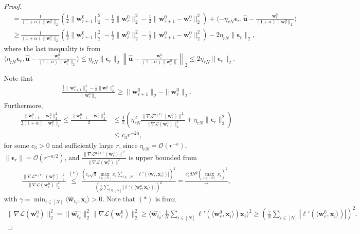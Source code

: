 \documentclass{article} %
\theoremstyle{plain}
\theoremstyle{definition}
\theoremstyle{remark}
\def\bignorm#1{\left\lVert#1\right\rVert}
\def\bigopen#1{\left(#1\right)}
\newcommand{\Ls}{\mathcal{L}}
\def\ba{{\boldsymbol a}}
\def\bu{{\mathbf u}}
\def\bx{{\mathbf x}}
\def\bw{{\mathbf w}}
\begin{document}
\begin{proof}
\begin{align*}
        &=\frac{1}{(1+\alpha)\|\bw_r^0\|_2}\bigopen{\frac{1}{2}\|\bw_{r+1}^0\|_2^2 - \frac{1}{2}\|\bw_r^0\|_2^2 - \frac{1}{2}\|\bw_{r+1}^0-\bw_{r}^0\|_2^2} + \langle -\eta_{rN}\boldsymbol{\epsilon}_r, \hat{\bu} - \frac{\bw_r^0}{(1+\alpha)\|\bw_r^0\|_2} \rangle \\
        & \geq \frac{1}{(1+\alpha)\|\bw_r^0\|_2}\bigopen{\frac{1}{2}\|\bw_{r+1}^0\|_2^2 - \frac{1}{2}\|\bw_r^0\|_2^2 - \frac{1}{2}\|\bw_{r+1}^0-\bw_{r}^0\|_2^2} -2\eta_{rN} \|\boldsymbol{\epsilon}_r\|_2,
    \end{align*}
    where the last inequality is from $\langle\eta_{rN}\boldsymbol{\epsilon}_r, \hat{\bu} - \frac{\bw_r^0}{(1+\alpha)\|\bw_r^0\|_2} \rangle \leq \eta_{rN} \|\boldsymbol{\epsilon}_r\|_2\bignorm{\hat{\bu} - \frac{\bw_r^0}{(1+\alpha)\|\bw_r^0\|}}_2 \leq 2 \eta_{rN} \|\boldsymbol{\epsilon}_r\|_2$.
    
    Note that 
    \begin{align*}
        \frac{\frac{1}{2}\|\bw_{r+1}^0\|_2^2 - \frac{1}{2}\|\bw_r^0\|_2^2}{\|\bw_r^0\|_2} \geq \|\bw_{r+1}^0\|_2 - \|\bw_r^0\|_2.
    \end{align*}
    Furthermore, 
    \begin{align*}
        \frac{\|\bw_{r+1}^0-\bw_{r}^0\|_2^2}{2(1+\alpha)\|\bw_r^0\|_2} \leq \frac{\|\bw_{r+1}^0-\bw_{r}^0\|_2^2}{2} &\leq \frac{1}{2}\bigopen{\eta_{rN}^2 \frac{\|\nabla \Ls^{\ba(r)}(\bw_r^0)\|^2}{\|\nabla \Ls(\bw_r^0)\|_2^2} + \eta_{rN} \|\boldsymbol{\epsilon}_r\|_2^2}\\
        & \leq c_3 r^{-2a},
    \end{align*}
    for some $c_3>0$ and sufficiently large $r$, since $\eta_{rN} = \mathcal{O}(r^{-a})$, $\|\boldsymbol{\epsilon}_r\|=\mathcal{O}(r^{-a/2})$, and $\frac{\|\nabla \Ls^{\ba(r)}(\bw_r^0)\|^2}{\|\nabla \Ls(\bw_r^0)\|^2}$ is upper bounded from
    \begin{align*}
        \frac{\|\nabla \Ls^{\ba(r)}(\bw_r^0)\|_2^2}{\|\nabla \Ls(\bw_r^0)\|_2^2} \overset{(*)}{\leq} \frac{\bigopen{c_2\sqrt{d}\max_{i \in [N]}x_i\sum_{i \in [N]}|\ell'(\langle \bw_r^0, \bx_l \rangle)|}^2}{\bigopen{\frac{\gamma}{N}\sum_{i \in [N]}|\ell'(\langle \bw_r^0, \bx_i \rangle)|}^2} = \frac{c_2^2dN^2(\max_{i \in [N]}x_i)^2}{\gamma^2},
    \end{align*}
    with $\gamma = \min_{i \in [N]}\langle \hat{\bw}_{\ell_2}, \bx_i \rangle>0$. Note that $(*)$ is from
    \begin{align*}
        \|\nabla \Ls(\bw_r^0)\|_2^2 = \|\hat{\bw_{\ell_2}}\|_2^2 \|\nabla \Ls(\bw_r^0)\|_2^2 \geq \langle \hat{\bw_{\ell_2}}, \frac{1}{N}\sum_{i \in [N]} \ell'(\langle \bw_r^0, \bx_i \rangle)\bx_i\rangle^2 \geq \bigopen{\frac{\gamma}{N}\sum_{i \in [N]}|\ell'(\langle \bw_r^0, \bx_i \rangle)|}^2.
    \end{align*}
    

\end{proof}
\end{document}
